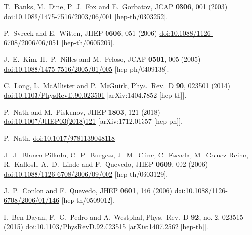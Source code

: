 \documentclass[12pt]{article}
\begin{document}
\begin{thebibliography}{99}
  T.~Banks, M.~Dine, P.~J.~Fox and E.~Gorbatov,
  JCAP {\bf 0306}, 001 (2003)
  \href{https://dx.doi.org/10.1088/1475-7516/2003/06/001}{doi:10.1088/1475-7516/2003/06/001}
  [hep-th/0303252].

  P.~Svrcek and E.~Witten,
  JHEP {\bf 0606}, 051 (2006)
  \href{https://dx.doi.org/10.1088/1126-6708/2006/06/051}{doi:10.1088/1126-6708/2006/06/051}
  [hep-th/0605206].

  J.~E.~Kim, H.~P.~Nilles and M.~Peloso,
  JCAP {\bf 0501}, 005 (2005)
  \href{https://dx.doi.org/10.1088/1475-7516/2005/01/005}{doi:10.1088/1475-7516/2005/01/005}
  [hep-ph/0409138].

  C.~Long, L.~McAllister and P.~McGuirk,
  Phys.\ Rev.\ D {\bf 90}, 023501 (2014)
  \href{https://dx.doi.org/10.1103/PhysRevD.90.023501}{doi:10.1103/PhysRevD.90.023501}
  [arXiv:1404.7852 [hep-th]].

  P.~Nath and M.~Piskunov,
  JHEP {\bf 1803}, 121 (2018)
  \href{https://dx.doi.org/10.1007/JHEP03(2018)121}{doi:10.1007/JHEP03(2018)121}
  [arXiv:1712.01357 [hep-ph]].

  P.~Nath,
  \href{https://dx.doi.org/10.1017/9781139048118}{doi:10.1017/9781139048118}

  J.~J.~Blanco-Pillado, C.~P.~Burgess, J.~M.~Cline, C.~Escoda, M.~Gomez-Reino, R.~Kallosh, A.~D.~Linde and F.~Quevedo,
  JHEP {\bf 0609}, 002 (2006)
  \href{https://dx.doi.org/10.1088/1126-6708/2006/09/002}{doi:10.1088/1126-6708/2006/09/002}
  [hep-th/0603129].

  J.~P.~Conlon and F.~Quevedo,
  JHEP {\bf 0601}, 146 (2006)
  \href{https://dx.doi.org/10.1088/1126-6708/2006/01/146}{doi:10.1088/1126-6708/2006/01/146}
  [hep-th/0509012].

  I.~Ben-Dayan, F.~G.~Pedro and A.~Westphal,
  Phys.\ Rev.\ D {\bf 92}, no. 2, 023515 (2015)
  \href{https://dx.doi.org/10.1103/PhysRevD.92.023515}{doi:10.1103/PhysRevD.92.023515}
  [arXiv:1407.2562 [hep-th]].


\end{thebibliography}
\end{document}
